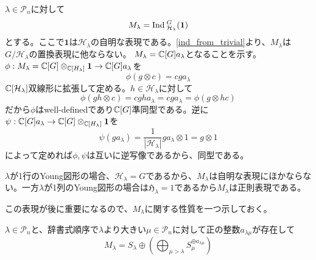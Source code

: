 \documentclass{ltjsreport}
\begin{document}
\begin{eg}\label{ind_from_horizontal_perm}
  $\lambda\in\mathcal{P}_n$に対して
  \[
  M_\lambda=\text{Ind}\:_{\mathcal{H}_\lambda}^{G}(\mathbf{1})  
  \]
  とする。ここで$\mathbf{1}$は$\mathcal{H}_\lambda$の自明な表現である。\ref{ind_from_trivial}より、$M_\lambda$は$G/\mathcal{H}_\lambda$の置換表現に他ならない。
  $M_\lambda=\mathbb{C}[G]a_\lambda$となることを示す。
  $\phi:M_\lambda=\mathbb{C}[G]\otimes_{\mathbb{C}[H_\lambda]} \mathbf{1}\rightarrow \mathbb{C}[G]a_\lambda$を
  \[
  \phi(g\otimes c)=cga_\lambda  
  \]
  $\mathbb{C}[\mathcal{H}_\lambda]$双線形に拡張して定める。$h\in\mathcal{H}_\lambda$に対して
  \[
  \phi(gh\otimes c)=cgha_\lambda=cga_\lambda=\phi(g\otimes hc)
  \]
  だから$\phi$はwell-definedであり$\mathbb{C}[G]$準同型である。逆に$\psi:\mathbb{C}[G]a_\lambda\rightarrow\mathbb{C}[G]\otimes_{\mathbb{C}[H_\lambda]} \mathbf{1}$を
  \[
  \psi(ga_\lambda)=\frac{1}{|\mathcal{H}_\lambda|}ga_\lambda\otimes 1=  g\otimes 1
  \]
  によって定めれば$\phi,\psi$は互いに逆写像であるから、同型である。
  
  $\lambda$が1行のYoung図形の場合、$\mathcal{H}_\lambda=G$であるから、$M_\lambda$は自明な表現にほかならない。一方$\lambda$が1列のYoung図形の場合は$\mathfrak{H}_\lambda=1$であるから$M_\lambda$は正則表現である。
  
  この表現が後に重要になるので、$M_\lambda$に関する性質を一つ示しておく。
\end{eg}

\begin{theo}[Youngの規則]\label{Young_rule_for_rep}
  $\lambda\in\mathcal{P}_n$と、辞書式順序で$\lambda$より大きい$\mu\in\mathcal{P}_n$に対して正の整数$a_{\lambda\mu}$が存在して
  \[
  M_\lambda=S_\lambda\oplus \left(\bigoplus_{\mu>\lambda}S_\mu^{\oplus a_{\lambda\mu}}\right)
  \]
\end{theo}
\end{document}
